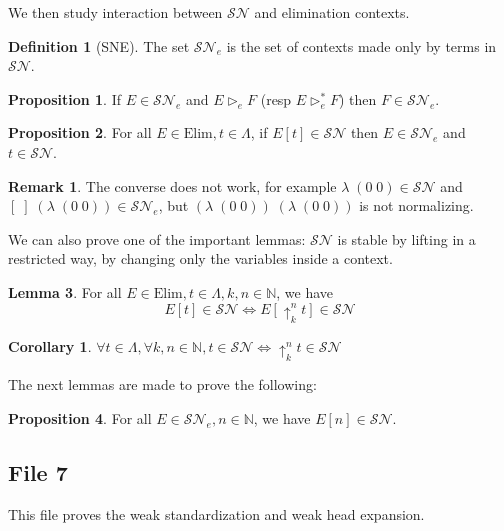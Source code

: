 \documentclass{article}
\newcommand{\SN}[0]{\mathcal{SN}}
\newcommand{\bN}[0]{\mathbb N}
\newcommand{\lift}[2]{\uparrow_{#1}^{#2}}
\newcommand{\Elim}[0]{\mathrm{Elim}}
\theoremstyle{definition}
\newtheorem{defi}{Definition}
\newtheorem{cor}{Corollary}
\newtheorem{prop}{Proposition}[subsection]
\newtheorem{lem}[prop]{Lemma}
\newtheorem*{rmk}{Remark}
\begin{document}
We then study interaction between $\SN$ and elimination contexts.

\begin{defi}[SNE]
    The set $\SN_e$ is the set of contexts made only by terms in $\SN$.
\end{defi}

\begin{prop}
    If $E\in\SN_e$ and $E\rhd_e F$ (resp $E\rhd_e^* F$) then $F\in\SN_e$.
\end{prop}

\begin{prop}
    For all $E\in\Elim,t\in\Lambda$, if $E[t]\in\SN$ then $E\in\SN_e$ and $t\in\SN$.
\end{prop}

\begin{rmk}
    The converse does not work, for example $\lambda\;(0\;0) \in \SN$ and $[\;]\;(\lambda\;(0\;0))\in\SN_e$,
    but $(\lambda\;(0\;0))\;(\lambda\;(0\;0))$ is not normalizing.
\end{rmk}

We can also prove one of the important lemmas: $\SN$ is stable by lifting in a restricted way, by changing
only the variables inside a context.

\begin{lem}
    For all $E\in\Elim,t\in\Lambda,k,n\in\bN$, we have
    $$E[t]\in\SN\iff E[\lift k n t]\in\SN$$
\end{lem}

\begin{cor}
    $\forall t\in\Lambda, \forall k,n\in\bN, t\in\SN \iff \lift k n t \in \SN$
\end{cor}

The next lemmas are made to prove the following:

\begin{prop}
    For all $E\in\SN_e, n\in \bN$, we have $E[n]\in\SN$.
\end{prop}

\subsection{File 7}

This file proves the weak standardization and weak head expansion.
\end{document}
